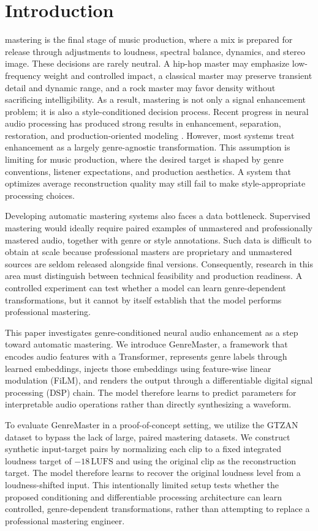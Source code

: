 \documentclass[journal]{IEEEtran}
\begin{document}
\section{Introduction}
 mastering is the final stage of music production, where a mix is prepared for release through adjustments to loudness, spectral balance, dynamics, and stereo image. These decisions are rarely neutral. A hip-hop master may emphasize low-frequency weight and controlled impact, a classical master may preserve transient detail and dynamic range, and a rock master may favor density without sacrificing intelligibility. As a result, mastering is not only a signal enhancement problem; it is also a style-conditioned decision process. Recent progress in neural audio processing has produced strong results in enhancement, separation, restoration, and production-oriented modeling \cite{purwins2019deep, mirbeygi2022speech}. However, most systems treat enhancement as a largely genre-agnostic transformation. This assumption is limiting for music production, where the desired target is shaped by genre conventions, listener expectations, and production aesthetics. A system that optimizes average reconstruction quality may still fail to make style-appropriate processing choices.

Developing automatic mastering systems also faces a data bottleneck. Supervised mastering would ideally require paired examples of unmastered and professionally mastered audio, together with genre or style annotations. Such data is difficult to obtain at scale because professional masters are proprietary and unmastered sources are seldom released alongside final versions. Consequently, research in this area must distinguish between technical feasibility and production readiness. A controlled experiment can test whether a model can learn genre-dependent transformations, but it cannot by itself establish that the model performs professional mastering.

This paper investigates genre-conditioned neural audio enhancement as a step toward automatic mastering. We introduce GenreMaster, a framework that encodes audio features with a Transformer, represents genre labels through learned embeddings, injects those embeddings using feature-wise linear modulation (FiLM), and renders the output through a differentiable digital signal processing (DSP) chain. The model therefore learns to predict parameters for interpretable audio operations rather than directly synthesizing a waveform.

To evaluate GenreMaster in a proof-of-concept setting, we utilize the GTZAN dataset to bypass the lack of large, paired mastering datasets. We construct synthetic input-target pairs by normalizing each clip to a fixed integrated loudness target of $-18\,\mathrm{LUFS}$ and using the original clip as the reconstruction target. The model therefore learns to recover the original loudness level from a loudness-shifted input. This intentionally limited setup tests whether the proposed conditioning and differentiable processing architecture can learn controlled, genre-dependent transformations, rather than attempting to replace a professional mastering engineer.
\end{document}
